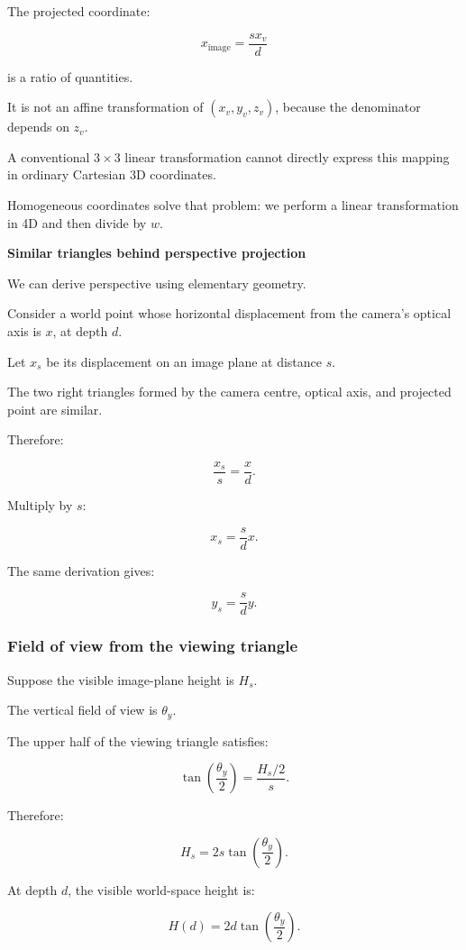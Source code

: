 The projected coordinate:

\[
 x_{\mathrm{image}}=\frac{s x_v}{d}
\]

is a ratio of quantities.

It is not an affine transformation of \((x_v,y_v,z_v)\), because the denominator depends on \(z_v\).

A conventional \(3\times3\) linear transformation cannot directly express this mapping in ordinary Cartesian 3D coordinates.

Homogeneous coordinates solve that problem: we perform a linear transformation in 4D and then divide by \(w\).

\textbf{Similar triangles behind perspective projection}

We can derive perspective using elementary geometry.

Consider a world point whose horizontal displacement from the camera's optical axis is \(x\), at depth \(d\).

Let \(x_s\) be its displacement on an image plane at distance \(s\).

The two right triangles formed by the camera centre, optical axis, and projected point are similar.

Therefore:

\[
 \frac{x_s}{s}=\frac{x}{d}.
\]

Multiply by \(s\):

\[
 \boxed{ x_s=\frac{s}{d}x }.
\]

The same derivation gives:

\[
 \boxed{ y_s=\frac{s}{d}y }.
\]

\subsubsection{Field of view from the viewing triangle}\label{field-of-view-from-the-viewing-triangle}

Suppose the visible image-plane height is \(H_s\).

The vertical field of view is \(\theta_y\).

The upper half of the viewing triangle satisfies:

\[
 \tan\left(\frac{\theta_y}{2}\right) = \frac{H_s/2}{s}.
\]

Therefore:

\[
 \boxed{ H_s=2s\tan\left(\frac{\theta_y}{2}\right) }.
\]

At depth \(d\), the visible world-space height is:

\[
 \boxed{ H(d)=2d\tan\left(\frac{\theta_y}{2}\right) }.
\]

